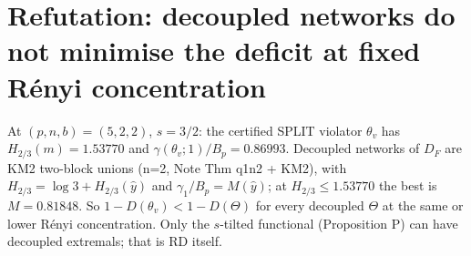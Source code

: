 \documentclass[11pt]{article}
\theoremstyle{remark}\newtheorem{remark}[theorem]{Remark}
\begin{document}
\section{Refutation: decoupled networks do not minimise the deficit at fixed R\'enyi concentration}
At $(p,n,b)=(5,2,2)$, $s=3/2$: the certified SPLIT violator $\theta_v$ has $H_{2/3}(m)=1.53770$ and $\gamma(\theta_v;1)/B_p=0.86993$.
Decoupled networks of $D_F$ are KM2 two-block unions (n=2, Note Thm q1n2 + KM2), with $H_{2/3}=\log3+H_{2/3}(\hat y)$ and $\gamma_1/B_p=M(\hat y)$;
at $H_{2/3}\le1.53770$ the best is $M=0.81848$. So $1-D(\theta_v)<1-D(\Theta)$ for every decoupled $\Theta$ at the same or lower R\'enyi concentration.
Only the $s$-tilted functional (Proposition P) can have decoupled extremals; that is RD itself.
\end{document}
